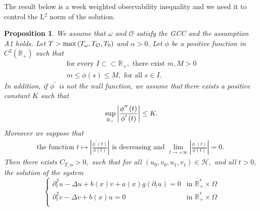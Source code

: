 \documentclass[11pt,reqno]{amsart}
\theoremstyle{plain}
\newtheorem{proposition}{Proposition}
\numberwithin{equation}{section}
\numberwithin{equation}{section}
\begin{document}
The result below is a week weighted observability inequality and we need it
to control the L$^{2}$ norm of the solution.

\begin{proposition}
\label{lemma compactness}We assume that $\omega $ and $\mathcal{O}$ satisfy
the GCC and the assumption A1 holds. Let $T>\max \left( T_{\omega },T_{%
\mathcal{O}},T_{0}\right) $ and $\alpha >0.$ Let $\phi $ be a positive
function in $C^{2}\left( 
\mathbb{R}
_{+}\right) $ such that%
\begin{equation}
\begin{array}{l}
\text{for every }I\subset \subset 
\mathbb{R}
_{+},\text{ there exist }m,M>0 \\ 
m\leq \phi \left( s\right) \leq M,\text{ for all }s\in I\text{.}%
\end{array}
\label{rho assumption}
\end{equation}%
In addition, if $\phi ^{\prime }$ is not the null function, we assume that$\ 
$there exists a positive constant $K$ such that%
\begin{equation}
\underset{%
\mathbb{R}
_{+}}{\sup }\left\vert \frac{\phi ^{\prime \prime }\left( t\right) }{\phi
^{\prime }\left( t\right) }\right\vert \leq K.  \label{rho assumption 1}
\end{equation}%
Moreover we suppose that 
\begin{equation}
\begin{array}{c}
\text{ the function\ \ }t\longmapsto \left\vert \frac{\phi ^{\prime }\left(
t\right) }{\phi \left( t\right) }\right\vert \text{ is decreasing and }%
\underset{t\rightarrow +\infty }{\lim }\left\vert \frac{\phi ^{\prime
}\left( t\right) }{\phi \left( t\right) }\right\vert =0.\text{\ \ }%
\end{array}
\label{rho assumption 2}
\end{equation}%
Then there exists $C_{T,\alpha }>0,$ such that for all $\left(
u_{0},v_{0},u_{1},v_{1}\right) \in \mathcal{H},$ and all $t>0,$ the solution
of the system%
\begin{equation}
\left\{ 
\begin{array}{ll}
\partial _{t}^{2}u-\Delta u+b(x)v+a(x)g\left( \partial _{t}u\right) =0 & 
\text{in }\mathbb{R}_{+}^{\ast }\times \Omega \\ 
\partial _{t}^{2}v-\Delta v+b(x)u=0 & \text{in }\mathbb{R}_{+}^{\ast }\times
\Omega \\ 

\end{array}
\end{equation}
\end{proposition}
\end{document}
